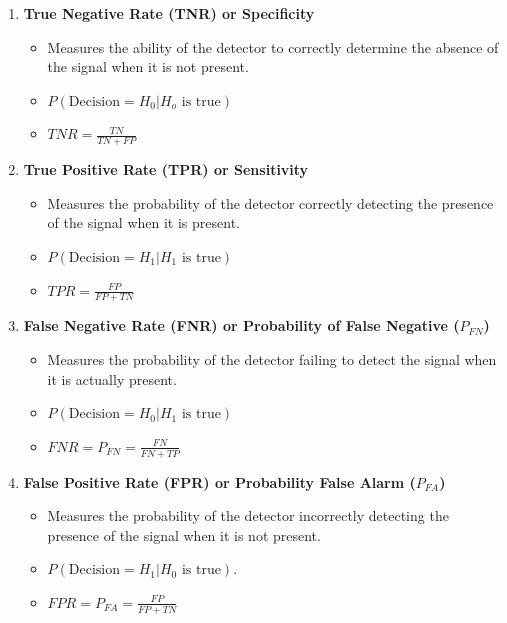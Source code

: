 \documentclass[12pt]{book}
\theoremstyle{definition}
\begin{document}
\begin{enumerate}

\item \textbf{True Negative Rate (TNR) or Specificity}
\begin{itemize}
    \item Measures the ability of the detector to correctly determine the absence of the signal when it is not present.
    \item \(P(\text{Decision} = H_0 | H_o \text{ is true})\)
    \item \(TNR = \frac{{TN}}{{TN + FP}}\)
\end{itemize}

\item \textbf{True Positive Rate (TPR) or Sensitivity}
\begin{itemize}
    \item  Measures the probability of the detector correctly detecting the presence of the signal when it is present.
    \item \(P(\text{Decision} = H_1 | H_1 \text{ is true})\)
    \item \(TPR = \frac{{FP}}{{FP + TN}}\)
\end{itemize}

\item \textbf{False Negative Rate (FNR) or Probability of False Negative (\(P_{FN}\))}
\begin{itemize}
    \item  Measures the probability of the detector failing to detect the signal when it is actually present.
    \item \(P(\text{Decision} = H_0 | H_1 \text{ is true})\)
    \item \(FNR = P_{FN} =  \frac{{FN}}{{FN + TP}}\)
\end{itemize}


\item \textbf{False Positive Rate (FPR) or Probability False Alarm (\(P_{FA}\))}
\begin{itemize}
    \item  Measures the probability of the detector incorrectly detecting the presence of the signal when it is not present.
    \item \(P(\text{Decision} = H_1 | H_0 \text{ is true})\).
    \item \(FPR = P_{FA} =  \frac{{FP}}{{FP + TN}}\)
\end{itemize}






\end{enumerate}
\end{document}
